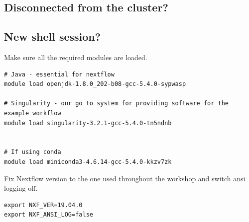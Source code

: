 \subsection{Disconnected from the cluster?}  

\subsection{New shell session?}

Make sure all the required modules are loaded. 

\begin{steps}
\begin{lstlisting}
# Java - essential for nextflow
module load openjdk-1.8.0_202-b08-gcc-5.4.0-sypwasp 

# Singularity - our go to system for providing software for the example workflow
module load singularity-3.2.1-gcc-5.4.0-tn5ndnb


# If using conda 
module load miniconda3-4.6.14-gcc-5.4.0-kkzv7zk
\end{lstlisting}
\end{steps}


Fix Nextflow version to the one used throughout the workshop and switch ansi logging off.

\begin{steps}
\begin{lstlisting}
export NXF_VER=19.04.0
export NXF_ANSI_LOG=false
\end{lstlisting}
\end{steps}


